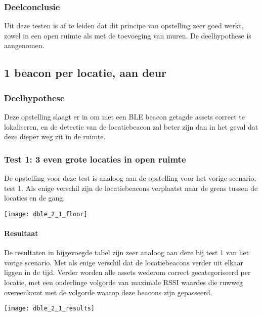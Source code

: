 \subsubsection{Deelconclusie}
Uit deze testen is af te leiden dat dit principe van opstelling zeer goed werkt, zowel in een open ruimte als met de toevoeging van muren. De deelhypothese is aangenomen.
	

\subsection{1 beacon per locatie, aan deur}
\subsubsection{Deelhypothese}
Deze opstelling slaagt er in om met een BLE beacon getagde assets correct te lokaliseren, en de detectie van de locatiebeacon zal beter zijn dan in het geval dat deze dieper weg zit in de ruimte.

\subsubsection{Test 1: 3 even grote locaties in open ruimte}
\begin{minipage}{0.55\textwidth}
De opstelling voor deze test is analoog aan de opstelling voor het vorige scenario, test 1. Als enige verschil zijn de locatiebeacons verplaatst naar de grens tussen de locaties en de gang.
\end{minipage}
\hfill
\begin{minipage}{0.42\textwidth}
	\texttt{[image: dble\_2\_1\_floor]}
	\label{fig:ond-ble-dynamic-2-1-ops}
\end{minipage}

\paragraph{Resultaat}
\begin{minipage}{0.42\textwidth}
De resultaten in bijgevoegde tabel zijn zeer analoog aan deze bij test 1 van het vorige scenario. Met als enige verschil dat de locatiebeacons verder uit elkaar liggen in de tijd. Verder worden alle assets wederom correct gecategoriseerd per locatie, met een onderlinge volgorde van maximale RSSI waardes die ruwweg overeenkomt met de volgorde waarop deze beacons zijn gepasseerd. 
\end{minipage}
\hfill
\begin{minipage}{0.55\textwidth}
	\texttt{[image: dble\_2\_1\_results]}
	\label{fig:ond-ble-dynamic-2-1-res}
\end{minipage}

